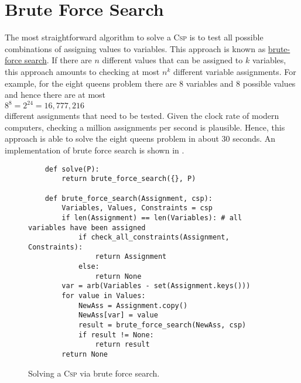 \section{Brute Force Search}
The most straightforward algorithm to solve a \textsc{Csp} is to test all possible combinations of assigning
values to variables.  This approach is known as
\href{https://en.wikipedia.org/wiki/Brute-force_search}{brute-force search}.
If there are $n$ different values that can be assigned to $k$ variables, this approach amounts to 
checking at most $n^k$ different variable assignments.  For example, for the eight queens problem there are 8
variables and 8 possible values and hence there are at most
\\[0.2cm]
\hspace*{1.3cm}
$8^8 = 2^{24} = 16,777,216$
\\[0.2cm]
different assignments that need to be tested.  Given the clock rate of modern computers, checking a million
assignments per second is plausible.  Hence, this approach is able to solve the eight queens problem in
about 30 seconds.  An implementation of brute force search is shown in . 

\begin{figure}[!ht]
\centering
\begin{verbatim}
    def solve(P):
        return brute_force_search({}, P)

    def brute_force_search(Assignment, csp):
        Variables, Values, Constraints = csp
        if len(Assignment) == len(Variables): # all variables have been assigned
            if check_all_constraints(Assignment, Constraints):
                return Assignment
            else:
                return None
        var = arb(Variables - set(Assignment.keys()))
        for value in Values:
            NewAss = Assignment.copy()
            NewAss[var] = value
            result = brute_force_search(NewAss, csp)
            if result != None:
                return result
        return None
\end{verbatim}
\vspace*{-0.3cm}
\caption{Solving a \textsc{Csp} via brute force search.}
\label{fig:Brute-Force-Solver.ipynb}
\end{figure}

